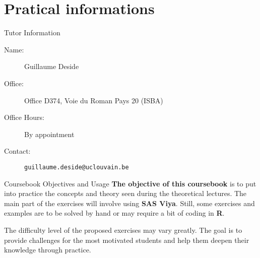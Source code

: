 \section{Pratical informations}
\begin{frame}[fragile]{Tutor Information}
\begin{description}
  \item[Name:] Guillaume Deside
  \item[Office:] Office D374, Voie du Roman Pays 20 (ISBA)
  \item[Office Hours:] By appointment
  \item[Contact:] \texttt{guillaume.deside@uclouvain.be}
\end{description}
\end{frame}

\begin{frame}[fragile]{Coursebook Objectives and Usage}
\textbf{The objective of this coursebook} is to put into practice the concepts and theory 
seen during the theoretical lectures. The main part of the exercises will involve using 
\textbf{SAS Viya}. Still, some exercises and examples are to be solved by hand or may 
require a bit of coding in \textbf{R}.

\vspace{0.3cm}
The difficulty level of the proposed exercises may vary greatly. The goal is to provide challenges for the most motivated students and help them deepen their knowledge through practice.
\end{frame}

